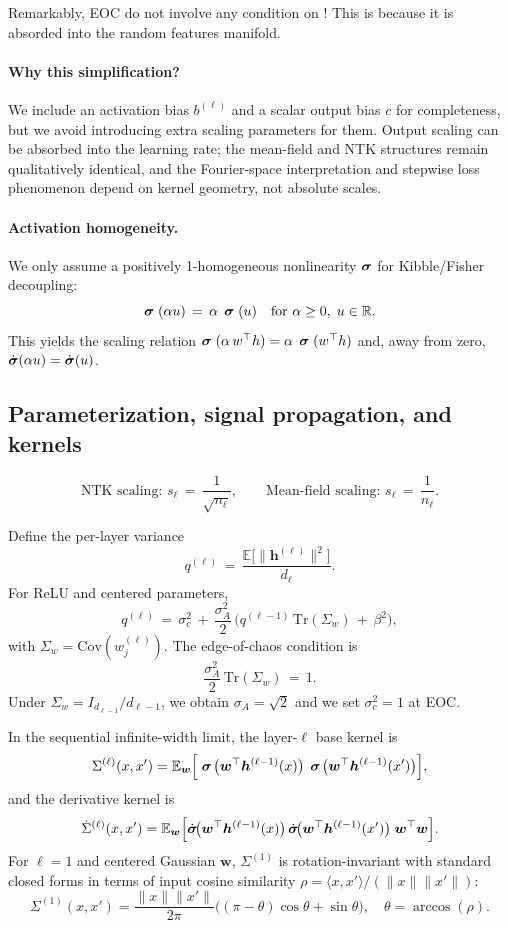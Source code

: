 Remarkably, EOC do not involve any condition on \beta ! This is because it is absorded into the random features manifold.

\paragraph{Why this simplification?}
We include an activation bias \( b^{(\ell)} \) and a scalar output bias \( c \) for completeness, but we avoid introducing extra scaling parameters for them. Output scaling can be absorbed into the learning rate; the mean-field and NTK structures remain qualitatively identical, and the Fourier-space interpretation and stepwise loss phenomenon depend on kernel geometry, not absolute scales.

\paragraph{Activation homogeneity.}
We only assume a positively 1-homogeneous nonlinearity \(\mathrel{\boldsymbol{\sigma}}\) for Kibble/Fisher decoupling:
\[
\mathrel{\boldsymbol{\sigma}}(\alpha u) \,=\, \alpha\,\mathrel{\boldsymbol{\sigma}}(u) \quad \text{for } \alpha \ge 0,\; u \in \mathbb{R}.
\]
This yields the scaling relation \(\mathrel{\boldsymbol{\sigma}}(\alpha\, w^\top h) = \alpha\,\mathrel{\boldsymbol{\sigma}}(w^\top h)\) and, away from zero, \(\dot{\mathrel{\boldsymbol{\sigma}}}(\alpha u)=\dot{\mathrel{\boldsymbol{\sigma}}}(u)\).

\subsection{Parameterization, signal propagation, and kernels}
\[
\text{NTK scaling: } s_\ell \,=\, \frac{1}{\sqrt{n_\ell}}, \qquad
\text{Mean-field scaling: } s_\ell \,=\, \frac{1}{n_\ell}.
\]

Define the per-layer variance
\[
q^{(\ell)} \,=\, \frac{\mathbb{E}\big[\|\bm{h}^{(\ell)}\|^2\big]}{d_\ell}.
\]
For ReLU and centered parameters,
\[
q^{(\ell)} \,=\, \sigma_c^2 \, + \, \frac{\sigma_A^2}{2}\,\Big(q^{(\ell-1)}\,\mathrm{Tr}(\Sigma_w) \, + \, \beta^2\Big),
\]
with \(\Sigma_w = \mathrm{Cov}(w^{(\ell)}_j)\). The edge-of-chaos condition is
\[
\frac{\sigma_A^2}{2}\,\mathrm{Tr}(\Sigma_w) \,=\, 1.
\]
Under \(\Sigma_w = I_{d_{\ell-1}}/d_{\ell-1}\), we obtain \(\sigma_A = \sqrt{2}\) and we set \(\sigma_c^2 = 1\) at EOC.

In the sequential infinite-width limit, the layer-\( \ell \) base kernel is
\begin{equation}
\Sigma^{(\ell)}(x,x')
= \mathbb{E}_{\bm{w}}\Big[\mathrel{\boldsymbol{\sigma}}\!\big(\bm{w}^\top \bm{h}^{(\ell-1)}(x)\big)\,\mathrel{\boldsymbol{\sigma}}\!\big(\bm{w}^\top \bm{h}^{(\ell-1)}(x')\big)\Big],
\end{equation}
and the derivative kernel is
\begin{equation}
\dot{\Sigma}^{(\ell)}(x,x')
= \mathbb{E}_{\bm{w}}\Big[\dot{\mathrel{\boldsymbol{\sigma}}}\!\big(\bm{w}^\top \bm{h}^{(\ell-1)}(x)\big)\,\dot{\mathrel{\boldsymbol{\sigma}}}\!\big(\bm{w}^\top \bm{h}^{(\ell-1)}(x')\big)\;\bm{w}^\top\bm{w}\Big].
\end{equation}
For \( \ell=1 \) and centered Gaussian \( \bm{w} \), \( \Sigma^{(1)} \) is rotation-invariant with standard closed forms in terms of input cosine similarity \( \rho = \langle x,x'\rangle/(\|x\|\|x'\|) \):
\[
\Sigma^{(1)}(x,x') = \frac{\|x\|\|x'\|}{2\pi}\big((\pi-\theta)\cos\theta + \sin\theta\big), \quad \theta = \arccos(\rho).
\]

